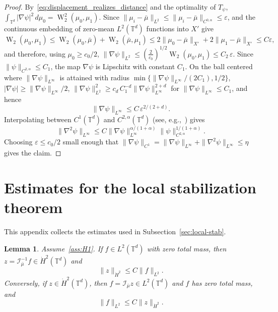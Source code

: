\documentclass[11pt]{article}
\numberwithin{equation}{section}
\newtheorem{lemma}[theorem]{Lemma}
\theoremstyle{definition}
\newcommand{\T}{\mathbb{T}}
\newcommand{\Wtwo}{\operatorname{W}_2}
\newcommand{\rieszmap}[1][\mu]{\mathcal{I}_{#1}}
\newcommand{\dotHk}[1][k]{\dot{H}^{#1}}
\begin{document}
\begin{proof}
    By~\eqref{eq:displacement_realizes_distance} and the optimality of $T_\psi$, $\int_{\T^d} |\nabla\psi|^2\,d\mu_0 = \Wtwo^2(\mu_0,\mu_1)$.
    Since $\|\mu_i - \bar\mu\|_{L^2} \le \|\mu_i - \bar\mu\|_{C^{0,\alpha}} \le \varepsilon$, \cite[Thm.~1.1]{peyre2018comparison} and the continuous embedding of zero-mean $L^2(\T^d)$ functions into $X'$ give
    \[
    \Wtwo(\mu_0,\mu_1) \le \Wtwo(\mu_0,\bar\mu) + \Wtwo(\bar\mu,\mu_1) \le 2\|\mu_0-\bar\mu\|_{X'} + 2\|\mu_1-\bar\mu\|_{X'} \le C\varepsilon, 
    \]
    and therefore, using $\mu_0 \ge c_0/2$, $\|\nabla\psi\|_{L^2} \le \left(\tfrac{2}{c_0}\right)^{1/2}\Wtwo(\mu_0,\mu_1) \le C_2\,\varepsilon$.
    Since $\|\psi\|_{C^{2,\alpha}} \le C_1$, the map $\nabla\psi$ is Lipschitz with constant $C_1$.
    On the ball centered where $\|\nabla\psi\|_{L^\infty}$ is attained with radius $\min\{\|\nabla\psi\|_{L^\infty}/(2C_1), 1/2\}$, $|\nabla\psi| \ge \|\nabla\psi\|_{L^\infty}/2$, $\|\nabla\psi\|_{L^2}^2 \ge c_d\,C_1^{-d} \|\nabla\psi\|_{L^\infty}^{2+d}$ for $\|\nabla\psi\|_{L^\infty} \le C_1$, and hence
    \[
    \|\nabla\psi\|_{L^\infty} \le C\,\varepsilon^{2/(2+d)}.
    \]
    Interpolating between $C^1(\T^d)$ and $C^{2,\alpha}(\T^d)$ (see, e.g.,~\cite[\S6.8]{gilbarg2015elliptic}) gives
    \[ 
    \|\nabla^2\psi\|_{L^\infty} \le C \|\nabla\psi\|_{L^\infty}^{\alpha/(1+\alpha)} \|\psi\|_{C^{2,\alpha}}^{1/(1+\alpha)}.
    \]
    Choosing $\varepsilon \le c_0/2$ small enough that $\|\nabla\psi\|_{C^1} = \|\nabla\psi\|_{L^\infty} + \|\nabla^2\psi\|_{L^\infty} \le \eta$ gives the claim.
\end{proof}

\section{Estimates for the local stabilization theorem}
\label{app:local-stabilization-estimates}

This appendix collects the estimates used in Subsection~\ref{sec:local-stab}.


\begin{lemma}
\label{lem:l2_density_to_form_domain}
    Assume~\ref{ass:H1}. 
    If $f \in L^2(\T^d)$ with zero total mass, then $z = \rieszmap[\bar\mu]^{-1} f \in \dotHk[2](\T^d)$ and
    \[
    \|z\|_{\dotHk[2]} \le C\|f\|_{L^2}.
    \]
    Conversely, if $z \in \dotHk[2](\T^d)$, then $f = \rieszmap[\bar\mu]z \in L^2(\T^d)$ and $f$ has zero total mass, and
    \[
    \|f\|_{L^2} \le C\|z\|_{\dotHk[2]}.
    \]
\end{lemma}
\end{document}
